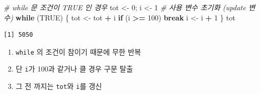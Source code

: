 \documentclass[
  11pt,
]{krantz}
\makeatletter
\newenvironment{Shaded}{\begin{snugshade}}{\end{snugshade}}
\newcommand{\CommentTok}[1]{\textcolor[rgb]{0.37,0.37,0.37}{\textit{#1}}}
\newcommand{\ControlFlowTok}[1]{\textcolor[rgb]{0.27,0.27,0.27}{\textbf{#1}}}
\newcommand{\DecValTok}[1]{\textcolor[rgb]{0.06,0.06,0.06}{#1}}
\newcommand{\NormalTok}[1]{#1}
\newcommand{\OperatorTok}[1]{\textcolor[rgb]{0.43,0.43,0.43}{\textbf{#1}}}
\newcommand{\OtherTok}[1]{\textcolor[rgb]{0.37,0.37,0.37}{#1}}
\newcommand{\StringTok}[1]{\textcolor[rgb]{0.5,0.5,0.5}{#1}}
\providecommand{\tightlist}{%
  \setlength{\itemsep}{0pt}\setlength{\parskip}{0pt}}
\newenvironment{kframe}{%
\medskip{}
\setlength{\fboxsep}{.8em}
 \def\at@end@of@kframe{}%
 \ifinner\ifhmode%
  \def\at@end@of@kframe{\end{minipage}}%
  \begin{minipage}{\columnwidth}%
 \fi\fi%
 \def\FrameCommand##1{\hskip\@totalleftmargin \hskip-\fboxsep
 \colorbox{shadecolor}{##1}\hskip-\fboxsep
     \hskip-\linewidth \hskip-\@totalleftmargin \hskip\columnwidth}%
 \MakeFramed {\advance\hsize-\width
   \@totalleftmargin\z@ \linewidth\hsize
   \@setminipage}}%
 {\par\unskip\endMakeFramed%
 \at@end@of@kframe}
\renewenvironment{quote}{\begin{kframe}}{\end{kframe}}
\makeatother
\begin{document}
\footnotesize

\begin{Shaded}
\begin{Highlighting}[]
\CommentTok{# while 문 조건이 TRUE 인 경우}
\NormalTok{tot <-}\StringTok{ }\DecValTok{0}\NormalTok{; i <-}\StringTok{ }\DecValTok{1} \CommentTok{# 사용 변수 초기화 (update 변수)}
\ControlFlowTok{while}\NormalTok{ (}\OtherTok{TRUE}\NormalTok{) \{}
\NormalTok{  tot <-}\StringTok{ }\NormalTok{tot }\OperatorTok{+}\StringTok{ }\NormalTok{i}
  \ControlFlowTok{if}\NormalTok{ (i }\OperatorTok{>=}\StringTok{ }\DecValTok{100}\NormalTok{) }\ControlFlowTok{break}
\NormalTok{  i <-}\StringTok{ }\NormalTok{i }\OperatorTok{+}\StringTok{ }\DecValTok{1}
\NormalTok{\}}
\NormalTok{tot}
\end{Highlighting}
\end{Shaded}

\begin{verbatim}
[1] 5050
\end{verbatim}

\normalsize

\begin{quote}
\begin{enumerate}
\def\labelenumi{\arabic{enumi}.}
\tightlist
\item
  \texttt{while} 의 조건이 참이기 때문에 무한 반복
\item
  단 \texttt{i}가 100과 같거나 클 경우 구문 탈출
\item
  그 전 까지는 \texttt{tot}와 \texttt{i}를 갱신
\end{enumerate}
\end{quote}

\footnotesize
\end{document}
